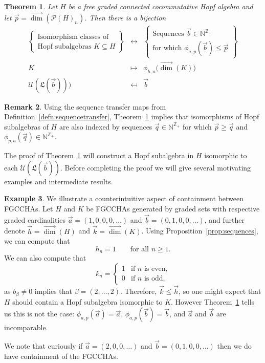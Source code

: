 \documentclass[11pt]{amsart}
\newtheorem{theorem}{Theorem}[section]
\theoremstyle{definition}
\newtheorem{example}[theorem]{Example}
\newtheorem{remark}[theorem]{Remark}
\numberwithin{equation}{section}
\def\NN{{\mathbb N}}
\def\ZZ{{\mathbb Z}}
\newcommand{\FGCCHAs}{\textsf{FGCCHA}s\xspace}
\newcommand{\vecdim}{\overrightarrow{\dim}}
\begin{document}
\begin{theorem}
\label{thm:subclassification2}
Let $H$ be a free graded connected cocommutative Hopf algebra and let $\vec{p} = \vecdim(\mathcal{P}(H)_{n})$.  Then there is a bijection
\[
\begin{array}{rcl}
\left\{\begin{array}{c}
\text{Isomorphism classes of} \\
\text{Hopf subalgebras $K \subseteq H$}
\end{array}\right\}
& \leftrightarrow & 
\left\{\begin{array}{c}
\text{Sequences $\vec{b} \in \NN^{\ZZ_{+}}$} \\
\text{for which $\phi_{a, p}(\vec{b}) \le \vec{p}$} 
\end{array}\right\} \\[1.5em]
K & \mapsto & \phi_{h, a} \big( \vecdim(K)\big) \\
\mathcal{U}(\mathfrak{L}(\vec{b}))) & \mapsfrom & \vec{b}
\end{array}
\]
\end{theorem}

\begin{remark}
Using the sequence transfer maps from Definition~\ref{defn:sequencetransfer}, Theorem~\ref{thm:subclassification2} implies that isomorphisms of Hopf subalgebras of $H$ are also indexed by sequences $\vec{q} \in \NN^{\ZZ_{+}}$ for which $\vec{p} \ge \vec{q}$ and $\phi_{p, a}(\vec{q}) \in \NN^{\ZZ_{+}}$.
\end{remark}

The proof of Theorem~\ref{thm:subclassification2} will construct a Hopf subalgebra in $H$ isomorphic to each
$\mathcal{U}(\mathfrak{L}(\vec{b}))$.
Before completing the proof we will give several motivating examples and intermediate results.

\begin{example}
We illustrate a counterintuitive aspect of containment between \FGCCHAs. Let $H$ and $K$ be \FGCCHAs generated by graded sets with respective graded cardinalities $\vec{a}=(1,0,0,0,\dots)$ and $\vec{b}=(0,1,0,0,\dots)$, and further denote $\vec{h} = \vecdim(H)$ and $\vec{k} = \vecdim(K)$.
Using Proposition~\ref{prop:sequences}, we can compute that
\[
h_n = 1 \qquad\text{for all $n \ge 1$}.
\]
We can also compute that
\[
k_{n} = \begin{cases} 1 & \text{if $n$ is even,} \\ 0 & \text{if $n$ is odd,} \end{cases}
\]
as $b_{\beta} \neq 0$ implies that $\beta = (2, \ldots, 2)$.  
Therefore, $\vec{k} \le \vec{h}$, so one might expect that $H$ should contain a Hopf subalgebra isomorphic to $K$.  
However Theorem~\ref{thm:subclassification2} tells us this is not the case: $\phi_{a,p}(\vec{a}) = \vec{a}$, $\phi_{a, p}(\vec{b}) = \vec{b}$, and $\vec{a}$ and $\vec{b}$ are incomparable.

We note that curiously if $\vec{a}=(2,0,0,\ldots)$ and $\vec{b}=(0,1,0, 0,\ldots)$ then
we do have containment of the \FGCCHAs.
\end{example}
\end{document}

